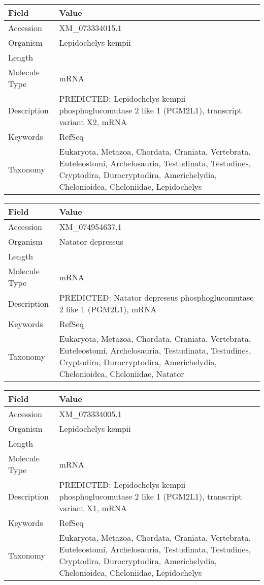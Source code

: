 \documentclass[10pt]{article}
\begin{document}
\vspace{1em}
{\footnotesize
\begin{longtable}{>{\raggedright\arraybackslash}p{4.5cm} >{\raggedright\arraybackslash}p{11.5cm}}
\textbf{Field} & \textbf{Value} \\
\hline
Accession & XM\_073334015.1 \\
Organism & Lepidochelys kempii \\
Length & 7810 \\
Molecule Type & mRNA \\
Description & PREDICTED: Lepidochelys kempii phosphoglucomutase 2 like 1 (PGM2L1), transcript variant X2, mRNA \\
Keywords & RefSeq \\
Taxonomy & Eukaryota, Metazoa, Chordata, Craniata, Vertebrata, Euteleostomi, Archelosauria, Testudinata, Testudines, Cryptodira, Durocryptodira, Americhelydia, Chelonioidea, Cheloniidae, Lepidochelys \\
\end{longtable}
}

\vspace{1em}
{\footnotesize
\begin{longtable}{>{\raggedright\arraybackslash}p{4.5cm} >{\raggedright\arraybackslash}p{11.5cm}}
\textbf{Field} & \textbf{Value} \\
\hline
Accession & XM\_074954637.1 \\
Organism & Natator depressus \\
Length & 7759 \\
Molecule Type & mRNA \\
Description & PREDICTED: Natator depressus phosphoglucomutase 2 like 1 (PGM2L1), mRNA \\
Keywords & RefSeq \\
Taxonomy & Eukaryota, Metazoa, Chordata, Craniata, Vertebrata, Euteleostomi, Archelosauria, Testudinata, Testudines, Cryptodira, Durocryptodira, Americhelydia, Chelonioidea, Cheloniidae, Natator \\
\end{longtable}
}

\vspace{1em}
{\footnotesize
\begin{longtable}{>{\raggedright\arraybackslash}p{4.5cm} >{\raggedright\arraybackslash}p{11.5cm}}
\textbf{Field} & \textbf{Value} \\
\hline
Accession & XM\_073334005.1 \\
Organism & Lepidochelys kempii \\
Length & 8039 \\
Molecule Type & mRNA \\
Description & PREDICTED: Lepidochelys kempii phosphoglucomutase 2 like 1 (PGM2L1), transcript variant X1, mRNA \\
Keywords & RefSeq \\
Taxonomy & Eukaryota, Metazoa, Chordata, Craniata, Vertebrata, Euteleostomi, Archelosauria, Testudinata, Testudines, Cryptodira, Durocryptodira, Americhelydia, Chelonioidea, Cheloniidae, Lepidochelys \\
\end{longtable}
}
\end{document}
